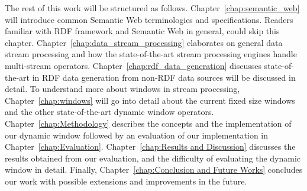 The rest of this work will be structured as follows. Chapter~\ref{chap:semantic_web} will 
introduce common Semantic Web terminologies and specifications. Readers familiar
with RDF framework and Semantic Web in general, could skip this chapter. 
Chapter~\ref{chap:data_stream_processing} elaborates on general data stream processing 
and how the state-of-the-art stream processing engines handle multi-stream operators. 
Chapter~\ref{chap:rdf_data_generation} discusses state-of-the-art in 
RDF data generation from non-RDF data sources will be discussed in detail. 
To understand more about windows in stream processing, Chapter~\ref{chap:windows}
will go into detail about the current fixed size windows and the other state-of-the-art 
dynamic window operators. Chapter~\ref{chap:Methodology} describes the concepts and the 
implementation of our dynamic window followed by an evaluation of our implementation in 
Chapter~\ref{chap:Evaluation}. Chapter~\ref{chap:Results and Discussion} discusses the results 
obtained from our evaluation, and the difficulty of evaluating the dynamic window in detail. 
Finally, Chapter~\ref{chap:Conclusion and Future Works} concludes our work with possible extensions and 
improvements in the future. 

